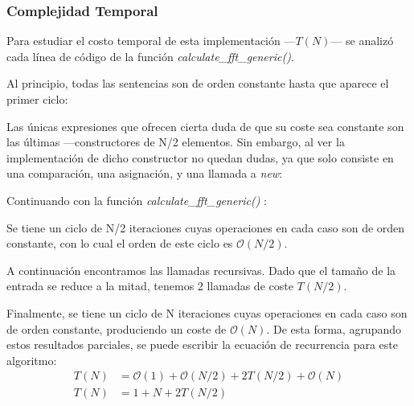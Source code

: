 \documentclass{article}
\begin{document}
    \subsubsection{Complejidad Temporal}
      Para estudiar el costo temporal de esta implementación ---$T(N)$--- se analizó
    cada línea de código de la función \textit{calculate\_fft\_generic()}.\par
    Al principio, todas las sentencias son de orden constante hasta que
    aparece el primer ciclo:
    
      Las únicas expresiones que ofrecen cierta duda de que su coste sea 
    constante son las últimas ---constructores de N/2 elementos. Sin embargo,
    al ver la implementación de dicho constructor no quedan dudas, ya que solo
    consiste en una comparación, una asignación, y una llamada a \textit{new}:
    
      Continuando con la función \textit{calculate\_fft\_generic()} :
    
      Se tiene un ciclo de N/2 iteraciones cuyas operaciones en cada caso
    son de orden constante, con lo cual el orden de este ciclo es $\mathcal{O}(N/2)$. \par
      A continuación encontramos las llamadas recursivas. Dado que el tamaño
     de la entrada se reduce a la mitad, tenemos 2 llamadas de coste $T(N/2)$. \par
      Finalmente, se tiene un ciclo de N iteraciones cuyas operaciones en cada 
    caso son de orden constante, produciendo un coste de $\mathcal{O}(N)$.
      De esta forma, agrupando estos resultados parciales, se puede escribir la
     ecuación de recurrencia para este algoritmo:
    \begin{align*}
      T(N) &= \mathcal{O}(1) + \mathcal{O}(N/2) + 2T(N/2) + \mathcal{O}(N) \\
      T(N) &= 1 + N + 2T(N/2) \\
    \end{align*}
\end{document}

